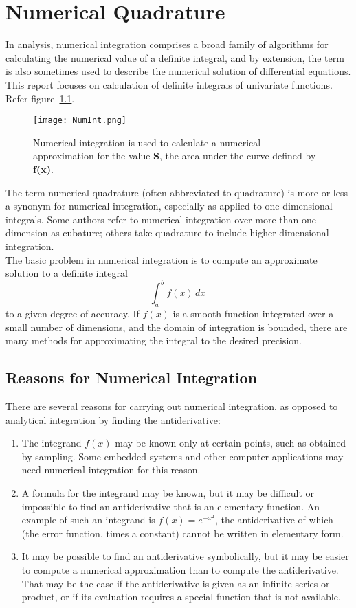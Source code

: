 \documentclass[a4paper, 12pt]{report}
\begin{document}
    \chapter{Numerical Quadrature}
In analysis, numerical integration comprises a broad family of algorithms for calculating the numerical value of a definite integral, and by extension, the term is also sometimes used to describe the numerical solution of differential equations. This report focuses on calculation of definite integrals of univariate functions. Refer figure~\ref{fig:NumInt}.\\
 \begin{figure}[h]
    \centering
    \texttt{[image: NumInt.png]}
    \caption{Numerical integration is used to calculate a numerical approximation for the value \textbf{S}, the area under the curve defined by \textbf{f(x)}.}
    \label{fig:NumInt}
    \end{figure}
The term numerical quadrature (often abbreviated to quadrature) is more or less a synonym for numerical integration, especially as applied to one-dimensional integrals. Some authors refer to numerical integration over more than one dimension as cubature; others take quadrature to include higher-dimensional integration.\\
The basic problem in numerical integration is to compute an approximate solution to a definite integral
\begin{equation}
    \int_{a}^{b} f(x)\,dx\
\label{eqn1}
\end{equation}
to a given degree of accuracy. If $f(x)$ is a smooth function integrated over a small number of dimensions, and the domain of integration is bounded, there are many methods for approximating the integral to the desired precision.
    \section{Reasons for Numerical Integration}
   There are several reasons for carrying out numerical integration, as opposed to analytical integration by finding the antiderivative:
   \begin{enumerate}
       \item The integrand $f(x)$ may be known only at certain points, such as obtained by sampling. Some embedded systems and other computer applications may need numerical integration for this reason.
       \item A formula for the integrand may be known, but it may be difficult or impossible to find an antiderivative that is an elementary function. An example of such an integrand is $f(x) = e^{-x^{2}}$, the antiderivative of which (the error function, times a constant) cannot be written in elementary form.
       \item It may be possible to find an antiderivative symbolically, but it may be easier to compute a numerical approximation than to compute the antiderivative. That may be the case if the antiderivative is given as an infinite series or product, or if its evaluation requires a special function that is not available.
   \end{enumerate}
\end{document}
